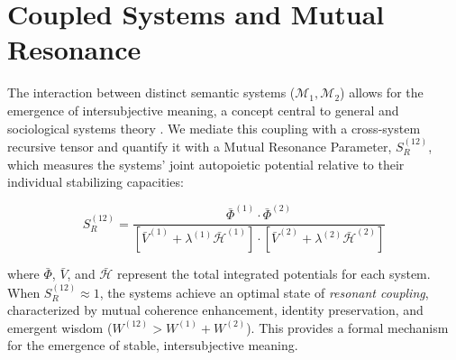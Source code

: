
\section{Coupled Systems and Mutual Resonance}
\label{sec:coupled_systems_and_mutual_resonance}

The interaction between distinct semantic systems (\(\mathcal{M}_1, \mathcal{M}_2\)) allows for the emergence of intersubjective meaning, a concept central to general and sociological systems theory \autocite{vonBertalanffy1968, Luhmann1995}. We mediate this coupling with a cross-system recursive tensor and quantify it with a Mutual Resonance Parameter, \(S_R^{(12)}\), which measures the systems' joint autopoietic potential relative to their individual stabilizing capacities:

\begin{equation}
S_R^{(12)} = \frac{\bar{\Phi}^{(1)} \cdot \bar{\Phi}^{(2)}}{[\bar{V}^{(1)} + \lambda^{(1)} \bar{\mathcal{H}}^{(1)}] \cdot [\bar{V}^{(2)} + \lambda^{(2)} \bar{\mathcal{H}}^{(2)}]}
\end{equation}

where \(\bar{\Phi}\), \(\bar{V}\), and \(\bar{\mathcal{H}}\) represent the total integrated potentials for each system. When \(S_R^{(12)} \approx 1\), the systems achieve an optimal state of \textit{resonant coupling}, characterized by mutual coherence enhancement, identity preservation, and emergent wisdom (\(W^{(12)} > W^{(1)} + W^{(2)}\)). This provides a formal mechanism for the emergence of stable, intersubjective meaning.